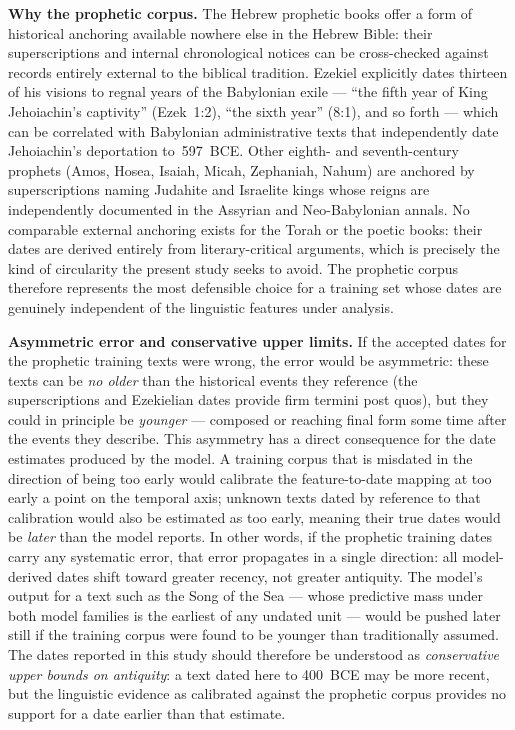 \documentclass[10pt,letterpaper]{article}
\begin{document}
\textbf{Why the prophetic corpus.}
The Hebrew prophetic books offer a form of historical anchoring available
nowhere else in the Hebrew Bible: their superscriptions and internal
chronological notices can be cross-checked against records entirely external
to the biblical tradition.  Ezekiel explicitly dates thirteen of his visions
to regnal years of the Babylonian exile --- ``the fifth year of King
Jehoiachin's captivity'' (Ezek~1:2), ``the sixth year'' (8:1), and so
forth --- which can be correlated with Babylonian administrative texts that
independently date Jehoiachin's deportation to~597~BCE.  Other eighth-
and seventh-century prophets (Amos, Hosea, Isaiah, Micah, Zephaniah,
Nahum) are anchored by superscriptions naming Judahite and Israelite kings
whose reigns are independently documented in the Assyrian and
Neo-Babylonian annals.  No comparable external anchoring exists for the
Torah or the poetic books: their dates are derived entirely from
literary-critical arguments, which is precisely the kind of circularity the
present study seeks to avoid.  The prophetic corpus therefore represents
the most defensible choice for a training set whose dates are genuinely
independent of the linguistic features under analysis.

\textbf{Asymmetric error and conservative upper limits.}
If the accepted dates for the prophetic training texts were wrong, the
error would be asymmetric: these texts can be \emph{no older} than the
historical events they reference (the superscriptions and Ezekielian dates
provide firm termini post quos), but they could in principle be
\emph{younger} --- composed or reaching final form some time after the
events they describe.  This asymmetry has a direct consequence for the
date estimates produced by the model.  A training corpus that is misdated
in the direction of being too early would calibrate the feature-to-date
mapping at too early a point on the temporal axis; unknown texts dated
by reference to that calibration would also be estimated as too early,
meaning their true dates would be \emph{later} than the model reports.
In other words, if the prophetic training dates carry any systematic error,
that error propagates in a single direction: all model-derived dates shift
toward greater recency, not greater antiquity.  The model's output for a
text such as the Song of the Sea --- whose predictive mass under both
model families is the earliest of any undated unit --- would be pushed
later still if the
training corpus were found to be younger than traditionally assumed.  The
dates reported in this study should therefore be understood as
\emph{conservative upper bounds on antiquity}: a text dated here to
400~BCE may be more recent, but the linguistic evidence as calibrated
against the prophetic corpus provides no support for a date earlier than
that estimate.
\end{document}
